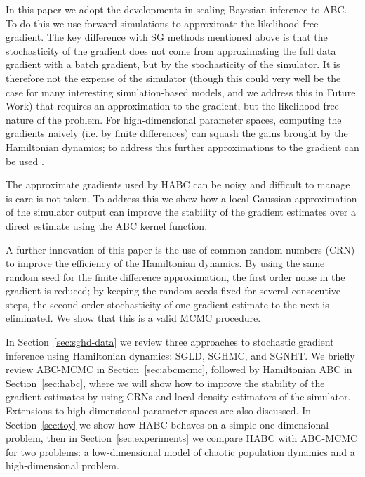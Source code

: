 \documentclass[]{article}
\begin{document}
In this paper we adopt the developments in scaling Bayesian inference to ABC.  To do this we use forward simulations to approximate the likelihood-free gradient.  The key difference with SG methods mentioned above is that the stochasticity of the gradient does not come from approximating the full data gradient with a batch gradient, but by the stochasticity of the simulator.  It is therefore not the expense of the simulator (though this could very well be the case for many interesting simulation-based models, and we address this in Future Work) that requires an approximation to the gradient, but the likelihood-free nature of the problem.  For high-dimensional parameter spaces, computing the gradients naively (i.e. by finite differences) can squash the gains brought by the Hamiltonian dynamics; to address this further approximations to the gradient can be used \cite{spall}.

The approximate gradients used by HABC can be noisy and difficult to manage is care is not taken.  To address this we show how a local Gaussian approximation of the simulator output can improve the stability of the gradient estimates over a direct estimate using the ABC kernel function.  

A further innovation of this paper is the use of common random numbers (CRN) to improve the efficiency of the Hamiltonian dynamics.  By using the same random seed for the finite difference approximation, the first order noise in the gradient is reduced;  by keeping the random seeds fixed for several consecutive steps, the second order stochasticity of one gradient estimate to the next is eliminated.  We show that this is a valid MCMC procedure.  
 
In Section~\ref{sec:sghd-data} we review three approaches to stochastic gradient inference using Hamiltonian dynamics: SGLD, SGHMC, and SGNHT.  We briefly review ABC-MCMC in Section~\ref{sec:abcmcmc}, followed by Hamiltonian ABC in Section~\ref{sec:habc}, where  we will show how to improve the stability of the gradient estimates by using CRNs and local density estimators of the simulator.  Extensions to high-dimensional parameter spaces are also discussed.  In Section~\ref{sec:toy} we show how HABC behaves on a simple one-dimensional problem, then in Section~\ref{sec:experiments} we compare HABC with ABC-MCMC for two problems: a low-dimensional model of chaotic population dynamics and a high-dimensional problem. 
 


\end{document}
